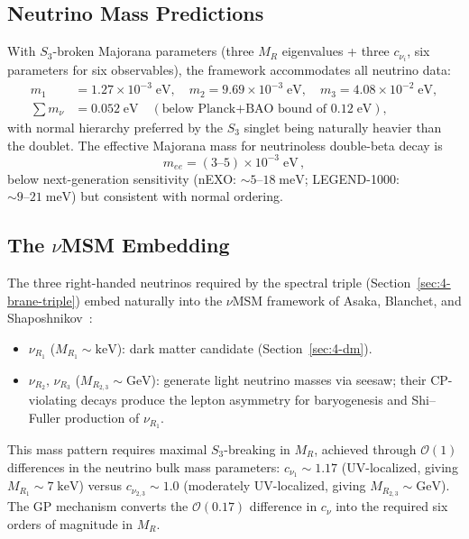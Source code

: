 \subsection{Neutrino Mass Predictions}
\label{sec:4-nu-mass}

With $S_3$-broken Majorana parameters (three $M_R$ eigenvalues + three $c_{\nu_i}$, six parameters for six observables), the framework accommodates all neutrino data:
\begin{equation}
\begin{aligned}
  m_1 &= 1.27 \times 10^{-3}\;\mathrm{eV}, \quad
  m_2 = 9.69 \times 10^{-3}\;\mathrm{eV}, \quad
  m_3 = 4.08 \times 10^{-2}\;\mathrm{eV},\\
  \sum m_\nu &= 0.052\;\mathrm{eV} \quad (\text{below Planck+BAO bound of } 0.12\;\mathrm{eV}),
\end{aligned}
  \label{eq:4-89}
\end{equation}
with normal hierarchy preferred by the $S_3$ singlet being naturally heavier than the doublet. The effective Majorana mass for neutrinoless double-beta decay is
\begin{equation}
  m_{ee} = (3\text{--}5) \times 10^{-3}\;\mathrm{eV}\,,
  \label{eq:4-90}
\end{equation}
below next-generation sensitivity (nEXO: $\sim 5\text{--}18\;\mathrm{meV}$; LEGEND-1000: $\sim 9\text{--}21\;\mathrm{meV}$) but consistent with normal ordering.

\subsection{The $\nu$MSM Embedding}
\label{sec:4-numsm}

The three right-handed neutrinos required by the spectral triple (Section~\ref{sec:4-brane-triple}) embed naturally into the $\nu$MSM framework of Asaka, Blanchet, and Shaposhnikov~\cite{ch4:ABS2005}:
\begin{itemize}
  \item $\nu_{R_1}$ ($M_{R_1} \sim \mathrm{keV}$): dark matter candidate (Section~\ref{sec:4-dm}).
  \item $\nu_{R_2},\, \nu_{R_3}$ ($M_{R_{2,3}} \sim \mathrm{GeV}$): generate light neutrino masses via seesaw; their CP-violating decays produce the lepton asymmetry for baryogenesis and Shi--Fuller production of $\nu_{R_1}$.
\end{itemize}
This mass pattern requires maximal $S_3$-breaking in $M_R$, achieved through $\mathcal{O}(1)$ differences in the neutrino bulk mass parameters: $c_{\nu_1} \sim 1.17$ (UV-localized, giving $M_{R_1} \sim 7\;\mathrm{keV}$) versus $c_{\nu_{2,3}} \sim 1.0$ (moderately UV-localized, giving $M_{R_{2,3}} \sim \mathrm{GeV}$). The GP mechanism converts the $\mathcal{O}(0.17)$ difference in $c_\nu$ into the required six orders of magnitude in $M_R$.


